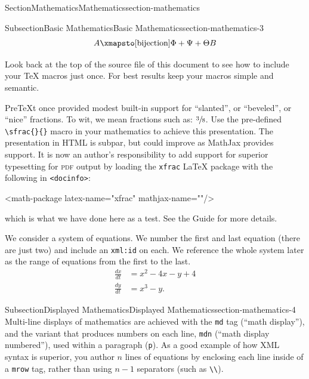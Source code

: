 \documentclass[twoside,10pt,]{article}
\newcommand{\mono}[1]{\texttt{#1}}
\newcommand{\initialism}[1]{\textsc{\MakeLowercase{#1}}}
\numberwithin{equation}{section}
\newcommand{\amp}{&}
\begin{document}
\begin{sectionptx}{Section}{Mathematics}{}{Mathematics}{}{}{section-mathematics}
\begin{subsectionptx}{Subsection}{Basic Mathematics}{}{Basic Mathematics}{}{}{section-mathematics-3}
\begin{equation*}
A\xmapsto[\text{bijection}]{\Phi+\Psi+\Theta}B
\end{equation*}
%
\par
Look back at the top of the source file of this document to see how to include your \TeX{} macros just once.  For best results keep your macros simple and semantic.%
\par
PreTeXt once provided modest built-in support for \textquotedblleft{}slanted\textquotedblright{}, or \textquotedblleft{}beveled\textquotedblright{}, or \textquotedblleft{}nice\textquotedblright{} fractions.  To wit, we mean fractions such as: \(\sfrac{3}{8}\).  Use the pre-defined \mono{\textbackslash{}sfrac\{\}\{\}} macro in your mathematics to achieve this presentation.  The presentation in HTML is subpar, but could improve as MathJax provides support.  It is now an author's responsibility to add support for superior typesetting for \initialism{PDF} output by loading the \mono{xfrac} \LaTeX{} package with the following in \mono{<docinfo>}:%
\begin{codedisplay}
<math-package latex-name="xfrac" mathjax-name=""/>
\end{codedisplay}
which is what we have done here as a test.  See the Guide for more details.%
\par
We consider a system of equations.  We number the first and last equation (there are just two) and include an \mono{xml:id} on each.  We reference the whole system later as the range of equations from the first to the last.%
\begin{align}
\frac{dx}{dt} \amp = x^2 - 4x - y + 4\label{equation-system-begin}\\
\frac{dy}{dt} \amp = x^3 - y.\label{equation-system-end}
\end{align}
%
\end{subsectionptx}
%
%
\typeout{************************************************}
\typeout{************************************************}
%
\begin{subsectionptx}{Subsection}{Displayed Mathematics}{}{Displayed Mathematics}{}{}{section-mathematics-4}
Multi-line displays of mathematics are achieved with the \mono{md} tag (\textquotedblleft{}math display\textquotedblright{}), and the variant that produces numbers on each line, \mono{mdn} (\textquotedblleft{}math display numbered\textquotedblright{}), used within a paragraph (\mono{p}).  As a good example of how XML syntax is superior, you author \(n\) lines of equations by enclosing each line inside of a \mono{mrow} tag, rather than using \(n-1\) separators (such as \mono{\textbackslash{}\textbackslash{}}).%

\end{subsectionptx}
\end{sectionptx}
\end{document}
